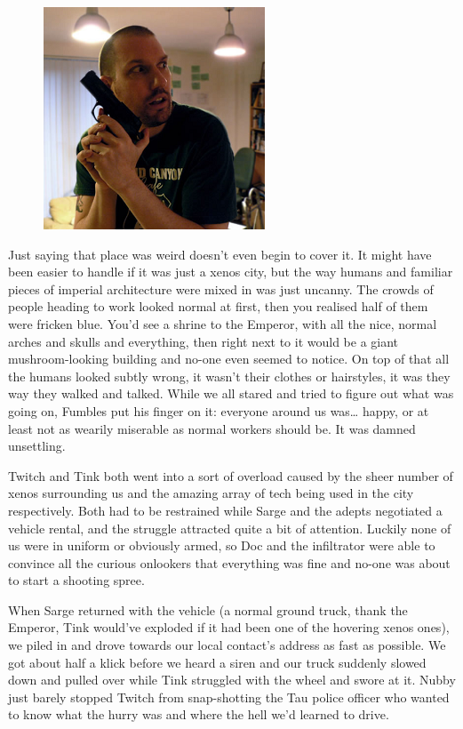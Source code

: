 \begin{figure}
	\begin{center}
		\includegraphics[width=\figwidth]{pics/10/13.png}
	\end{center}
\end{figure}
Just saying that place was weird doesn't even begin to cover it. 
It might have been easier to handle if it was just a xenos city, but the way humans and familiar pieces of imperial architecture were mixed in was just uncanny. 
The crowds of people heading to work looked normal at first, then you realised half of them were fricken blue. 
You'd see a shrine to the Emperor, with all the nice, normal arches and skulls and everything, then right next to it would be a giant mushroom-looking building and no-one even seemed to notice. 
On top of that all the humans looked subtly wrong, it wasn't their clothes or hairstyles, it was they way they walked and talked. 
While we all stared and tried to figure out what was going on, Fumbles put his finger on it: 
everyone around us was… happy, or at least not as wearily miserable as normal workers should be. 
It was damned unsettling.

Twitch and Tink both went into a sort of overload caused by the sheer number of xenos surrounding us and the amazing array of tech being used in the city respectively. 
Both had to be restrained while Sarge and the adepts negotiated a vehicle rental, and the struggle attracted quite a bit of attention. 
Luckily none of us were in uniform or obviously armed, so Doc and the infiltrator were able to convince all the curious onlookers that everything was fine and no-one was about to start a shooting spree.

When Sarge returned with the vehicle (a normal ground truck, thank the Emperor, Tink would've exploded if it had been one of the hovering xenos ones), we piled in and drove towards our local contact's address as fast as possible. 
We got about half a klick before we heard a siren and our truck suddenly slowed down and pulled over while Tink struggled with the wheel and swore at it. 
Nubby just barely stopped Twitch from snap-shotting the Tau police officer who wanted to know what the hurry was and where the hell we'd learned to drive.

